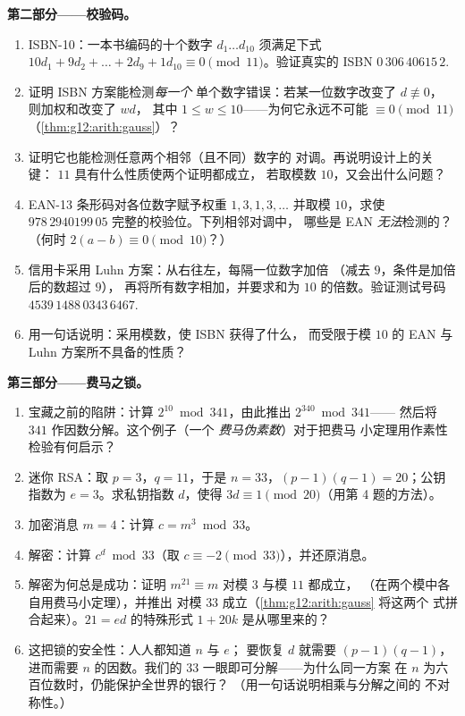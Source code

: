 \begin{problem}
\medskip
\noindent\textbf{第二部分——校验码。}
\begin{enumerate}[resume]
  \item ISBN-10：一本书编码的十个数字 $d_1 \dots d_{10}$
        须满足下式
        $10d_1 + 9d_2 + \dots + 2d_9 + 1d_{10} \equiv 0
        \pmod{11}$。验证真实的 ISBN
        $0\,306\,40615\,2$.
  \item 证明 ISBN 方案能检测\emph{每一个}
        单个数字错误：若某一位数字改变了 $d \not\equiv 0$，
        则加权和改变了 $w d$，
        其中 $1 \leq w \leq 10$——为何它永远不可能
        $\equiv 0 \pmod{11}$
        （\cref{thm:g12:arith:gauss}）？
  \item 证明它也能检测任意两个相邻（且不同）数字的
        对调。再说明设计上的关键：
        $11$ 具有什么性质使两个证明都成立，
        若取模数 $10$，又会出什么问题？
  \item EAN-13 条形码对各位数字赋予权重 $1, 3, 1, 3, \dots$
        并取模 $10$，求使
        $978\,2940199\,05$ 完整的校验位。下列相邻对调中，
        哪些是 EAN \emph{无法}检测的？（何时
        $2(a - b) \equiv 0 \pmod{10}$？）
  \item 信用卡采用 Luhn 方案：从右往左，每隔一位数字加倍
        （减去 $9$，条件是加倍后的数超过 $9$），
        再将所有数字相加，并要求和为
        $10$ 的倍数。验证测试号码
        $4539\,1488\,0343\,6467$.
  \item 用一句话说明：采用模数，使 ISBN 获得了什么，
        而受限于模 $10$ 的 EAN 与 Luhn 方案所不具备的性质？
\end{enumerate}

\medskip
\noindent\textbf{第三部分——费马之锁。}
\begin{enumerate}[resume]
  \item 宝藏之前的陷阱：计算
        $2^{10} \bmod 341$，由此推出 $2^{340} \bmod 341$——
        然后将 $341$ 作因数分解。这个例子（一个
        \emph{费马伪素数}）对于把费马
        小定理用作素性检验有何启示？
  \item 迷你 RSA：取 $p = 3$，$q = 11$，于是
        $n = 33$，$(p-1)(q-1) = 20$；公钥指数为
        $e = 3$。求私钥指数 $d$，使得
        $3d \equiv 1 \pmod{20}$（用第 4 题的方法）。
  \item 加密消息 $m = 4$：计算
        $c = m^3 \bmod 33$。
  \item 解密：计算 $c^d \bmod 33$（取
        $c \equiv -2 \pmod{33}$），并还原消息。
  \item 解密为何总是成功：证明
        $m^{21} \equiv m$ 对模 $3$ 与模 $11$ 都成立，
        （在两个模中各自用费马小定理），并推出
        对模 $33$ 成立（\cref{thm:g12:arith:gauss} 将这两个
        式拼合起来）。$21 = ed$ 的特殊形式
        $1 + 20k$ 是从哪里来的？
  \item 这把锁的安全性：人人都知道 $n$ 与 $e$；
        要恢复 $d$ 就需要 $(p-1)(q-1)$，进而需要
        $n$ 的因数。我们的 $33$ 一眼即可分解——为什么同一方案
        在 $n$ 为六百位数时，仍能保护全世界的银行？
        （用一句话说明相乘与分解之间的
        不对称性。）
\end{enumerate}


\end{problem}
